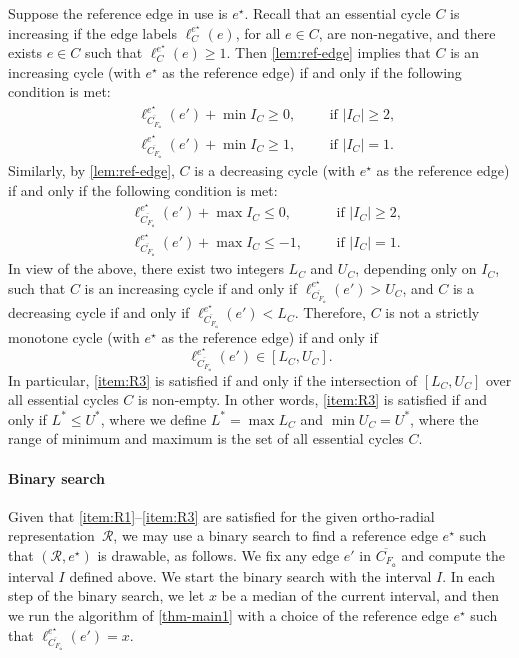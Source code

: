 \documentclass{theoretics}
\newcommand{\RR}{\mathcal{R}}
\newcommand{\FO}{F_\mathsf{o}}
\newcommand{\eref}{e^\star}
\begin{document}
Suppose the reference edge in use is $\eref$. Recall that an essential cycle $C$ is increasing if the edge labels $\ell_C^{\eref}(e)$, for all $e \in C$, are non-negative, and there exists $e \in C$ such that $\ell_C^{\eref}(e) \geq 1$.
Then \cref{lem:ref-edge} implies that $C$ is an increasing cycle (with $\eref$ as the reference edge) if and only if the following condition is met:
\begin{align*}
    &\ell_{\overline{C_{\FO}}}^{\eref}(e') + \min I_C \geq 0, && & \text{if $|I_C| \geq 2$,}\\
    &\ell_{\overline{C_{\FO}}}^{\eref}(e') + \min I_C \geq 1, && & \text{if $|I_C| = 1$.}
\end{align*}
Similarly, by \cref{lem:ref-edge}, $C$ is a decreasing cycle  (with $\eref$ as the reference edge) if and only if the following condition is met:
\begin{align*}
    &\ell_{\overline{C_{\FO}}}^{\eref}(e') + \max I_C \leq 0, && & \text{if $|I_C| \geq 2$,}\\
    &\ell_{\overline{C_{\FO}}}^{\eref}(e') + \max I_C \leq -1, && & \text{if $|I_C| = 1$.}
\end{align*}
In view of the above, there exist two integers $L_C$ and $U_C$, depending only on $I_C$, such that $C$ is an increasing cycle if and only if 
$\ell_{\overline{C_{\FO}}}^{\eref}(e') > U_C$,  and  $C$ is a decreasing cycle if and only if $\ell_{\overline{C_{\FO}}}^{\eref}(e') < L_C$. Therefore, $C$ is not a strictly monotone cycle (with $\eref$ as the reference edge) if and only if \[\ell_{\overline{C_{\FO}}}^{\eref}(e') \in [L_C, U_C].\] In particular, \ref{item:R3} is satisfied if and only if the intersection of $[L_C, U_C]$ over all essential cycles $C$ is non-empty. In other words,  \ref{item:R3} is satisfied if and only if $L^\ast  \leq U^\ast$, where we define $L^\ast = \max L_C$ and $\min U_C = U^\ast$, where the range of minimum and maximum is the set of all essential cycles $C$.

\paragraph{Binary search}
Given that \ref{item:R1}--\ref{item:R3} are satisfied for the given ortho-radial representation~$\RR$, we may use a binary search to find a reference edge $\eref$ such that  $(\RR, \eref)$ is drawable, as follows. We fix any edge $e'$ in $\overline{C_{\FO}}$ and compute the interval $I$ defined above. We start the binary search with the interval $I$.
In each step of the binary search, we let $x$ be a median of the current interval, and then we run the algorithm of \cref{thm-main1} with a choice of the reference edge $\eref$ such that $\ell_{\overline{C_{\FO}}}^{\eref}(e') = x$.
\end{document}
